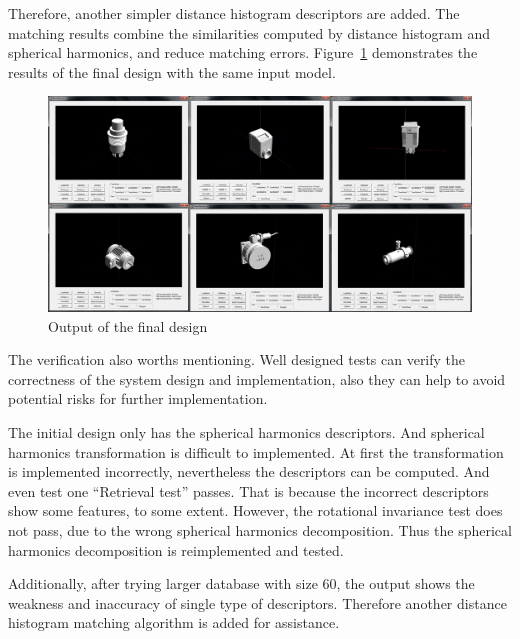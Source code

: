 Therefore, another simpler distance histogram  descriptors are added. The matching results combine the similarities computed by distance histogram and spherical harmonics, and reduce matching errors. Figure~\ref{output_finaldesign} demonstrates the results of the final design with the same input model. 
\begin{figure}[h]
\centering
\includegraphics[width=0.7\linewidth]{output_finaldesign}
\caption{Output of the final design} \label{output_finaldesign}
\end{figure}

The verification also worths mentioning. Well designed tests can verify the correctness of the system design and implementation, also they can help to avoid potential risks for further implementation. 

The initial design only has the spherical harmonics descriptors. And spherical harmonics transformation is difficult to implemented. At first the transformation is implemented incorrectly, nevertheless the descriptors can be computed. And even test one ``Retrieval test'' passes. That is because the incorrect descriptors show some features, to some extent. However, the rotational invariance test does not pass, due to the wrong spherical harmonics decomposition. Thus the spherical harmonics decomposition is reimplemented and tested. 

Additionally, after trying larger database with size 60, the output shows the weakness and inaccuracy of single type of descriptors. Therefore another distance histogram matching algorithm is added for assistance.